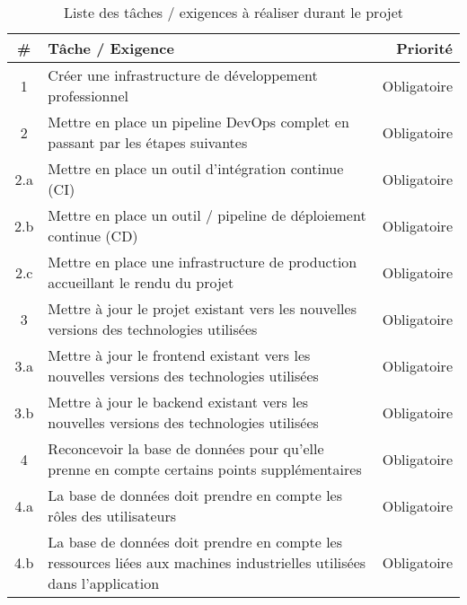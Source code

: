\documentclass[
    iai, %
    il, %
]{heig-tb}
\begin{document}
\begin{table}[h]
    \begin{center}
        \caption{Liste des tâches / exigences à réaliser durant le projet \label{taches}}
        \begin{tabular}{c|l|r}
            #   & Tâche / Exigence                                                                                                       & Priorité      \\ \hline
            1   & Créer une infrastructure de développement professionnel                                                                & Obligatoire   \\
            2   & Mettre en place un pipeline DevOps complet en passant par les étapes suivantes                                         & Obligatoire   \\
            2.a & Mettre en place un outil d'intégration continue (CI)                                                                   & Obligatoire   \\
            2.b & Mettre en place un outil / pipeline de déploiement continue (CD)                                                       & Obligatoire   \\
            2.c & Mettre en place une infrastructure de production accueillant le rendu du projet                                        & Obligatoire   \\
            3   & Mettre à jour le projet existant vers les nouvelles versions des technologies utilisées                                & Obligatoire   \\
            3.a & Mettre à jour le frontend existant vers les nouvelles versions des technologies utilisées                              & Obligatoire   \\
            3.b & Mettre à jour le backend existant vers les nouvelles versions des technologies utilisées                               & Obligatoire   \\
            4   & Reconcevoir la base de données pour qu'elle prenne en compte certains points supplémentaires                           & Obligatoire   \\
            4.a & La base de données doit prendre en compte les rôles des utilisateurs                                                   & Obligatoire   \\
            4.b & La base de données doit prendre en compte les ressources liées aux machines industrielles utilisées dans l'application & Obligatoire   \\

\end{tabular}
\end{center}
\end{table}
\end{document}
